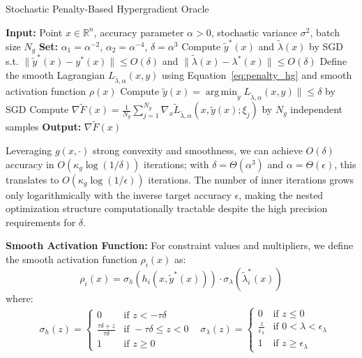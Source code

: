 \documentclass[letterpaper]{article} %
\DeclareMathOperator*{\argmin}{arg\,min}
\newcommand{\1}{\mathbf{1}}
\begin{document}
\begin{algorithm}[h!]
\caption{Stochastic Penalty-Based Hypergradient Oracle}
\label{alg:hypergradient_oracle}
\begin{algorithmic}[1]
\STATE \textbf{Input:} Point $x \in \mathbb{R}^n$, accuracy parameter $\alpha > 0$, stochastic variance $\sigma^2$, batch size $N_g$
\STATE \textbf{Set:} $\alpha_1 = \alpha^{-2}$, $\alpha_2 = \alpha^{-4}$, $\delta = \alpha^3$
\STATE Compute $\tilde{y}^*(x)$ and $\tilde{\lambda}(x)$ by SGD s.t. $\|\tilde{y}^*(x) - y^*(x)\| \leq O(\delta)$ and $\|\tilde{\lambda}(x) - \lambda^*(x)\| \leq O(\delta)$
\STATE Define the smooth Lagrangian $L_{\tilde{\lambda},\alpha}(x, y) $ using Equation~\ref{eq:penalty_hg} and smooth activation function $\rho(x)$ %
\STATE Compute $\tilde{y}(x) = \argmin_y L_{\tilde{\lambda},\alpha}(x, y)\| \leq \delta$ by SGD
\STATE Compute $\nabla\tilde{F}(x) = \frac{1}{N_g}\sum_{j=1}^{N_g} \nabla_x \tilde{L}_{\tilde{\lambda},\alpha}(x, \tilde{y}(x); \xi_j)$ by $N_g$ independent samples
\STATE \textbf{Output:} $\nabla\tilde{F}(x)$
\end{algorithmic}
\end{algorithm}

\begin{remark}
 Leveraging $g(x,\cdot)$ strong convexity and smoothness, we can achieve $O(\delta)$ accuracy in $O(\kappa_g\log(1/\delta))$ iterations; with $\delta=\Theta(\alpha^3)$ and $\alpha=\Theta(\epsilon)$, this translates to $O(\kappa_g\log(1/\epsilon))$ iterations. The number of inner iterations grows only logarithmically with the inverse target accuracy $\epsilon$, making the nested optimization structure computationally tractable despite the high precision requirements for $\delta$.
\end{remark}

\textbf{Smooth Activation Function:}
For constraint values and multipliers, we define the smooth activation function $\rho_i(x)$ as:
$$\rho_i(x) = \sigma_h(h_i(x, \tilde{y}^*(x))) \cdot \sigma_\lambda(\tilde{\lambda}^*_i(x))$$
where:
\begin{align}
    & \sigma_h(z) = \begin{cases}
0 & \text{if } z < -\tau \delta \\
\frac{\tau \delta + z}{\tau \delta} & \text{if } -\tau \delta \leq z < 0 \\
1 & \text{if } z \geq 0
\end{cases}
& \sigma_\lambda(z) = \begin{cases}
0 & \text{if } z \leq 0 \\
\frac{z}{\epsilon_\lambda} & \text{if } 0 < \lambda < \epsilon_\lambda \\
1 & \text{if } z \geq \epsilon_\lambda
\end{cases}
\end{align}
\end{document}

